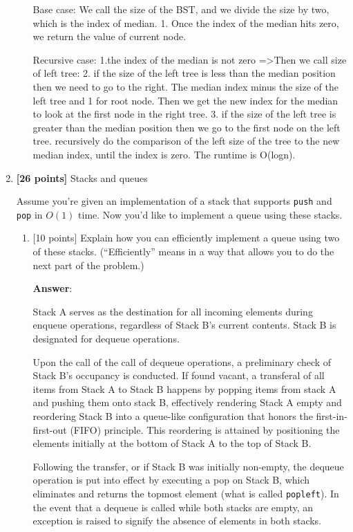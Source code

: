 \documentclass[11pt]{article}
\begin{document}
\begin{enumerate}
\begin{enumerate}
Base case: 
We call the size of the BST, and we divide the size by two, which is  the index of median. 1. Once the index of the median hits zero, we return the value of current node.

Recursive case: 
1.the index of the median is  not zero  =>Then we call size of left tree: 
2. if the size of the left tree is less than the median position then we need to go to the right. The median index minus the size of the left tree and 1 for root node. Then we get the new index for the median to look at the first node in the right tree.   
3. if the size of the left tree is greater than the median position then we go to the first node on the left tree.
recursively do the comparison of the left size of the tree to the new median index, until the index is zero.
The runtime is O(logn).


\end{enumerate}
  
\item \textbf{[26 points]} Stacks and queues

Assume you're given an implementation of a stack that supports {\tt push} and {\tt pop} in $O(1)$ time.  Now you'd like to implement a queue using these stacks.

\begin{enumerate}
\item {[10 points]} Explain how you can efficiently implement a queue using two of these stacks.  (``Efficiently'' means in a way that allows you to do the next part of the problem.)

\textbf{Answer}:

Stack A serves as the destination for all incoming elements during enqueue operations, regardless of Stack B's current contents. Stack B is designated for dequeue operations.

Upon the call of the call of dequeue operations, a preliminary check of Stack B's occupancy is conducted. If found vacant, a transferal of all items from Stack A to Stack B happens by popping items from stack A and pushing them onto stack B, effectively rendering Stack A empty and reordering Stack B into a queue-like configuration that honors the first-in-first-out (FIFO) principle. This reordering is attained by positioning the elements initially at the bottom of Stack A to the top of Stack B.

Following the transfer, or if Stack B was initially non-empty, the dequeue operation is put into effect by executing a pop on Stack B, which eliminates and returns the topmost element (what is called {\tt popleft}). In the event that a dequeue is called while both stacks are empty, an exception is raised to signify the absence of elements in both stacks.


\end{enumerate}
\end{enumerate}
\end{document}
